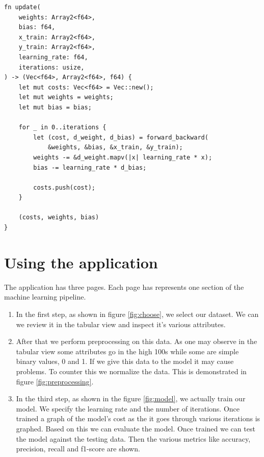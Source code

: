 \documentclass[12pt, a4]{article}
\begin{document}
\begin{verbatim}
fn update(
    weights: Array2<f64>,
    bias: f64,
    x_train: Array2<f64>,
    y_train: Array2<f64>,
    learning_rate: f64,
    iterations: usize,
) -> (Vec<f64>, Array2<f64>, f64) {
    let mut costs: Vec<f64> = Vec::new();
    let mut weights = weights;
    let mut bias = bias;

    for _ in 0..iterations {
        let (cost, d_weight, d_bias) = forward_backward(
            &weights, &bias, &x_train, &y_train);
        weights -= &d_weight.mapv(|x| learning_rate * x);
        bias -= learning_rate * d_bias;

        costs.push(cost);
    }

    (costs, weights, bias)
}
\end{verbatim}

\section{Using the application}

The application has three pages. Each page has represents one section of the
machine learning pipeline.

\begin{enumerate}
  \item{In the first step, as shown in figure \ref{fig:choose}, we select our
        dataset. We can we review it in the tabular view and inspect it's
        various attributes.}
  \item{After that we perform preprocessing on this data. As one may observe
        in the tabular view some attributes go in the high 100s while some
        are simple binary values, 0 and 1. If we give this data to the model
        it may cause problems. To counter this we normalize the data. This is
        demonstrated in figure \ref{fig:preprocessing}.}
  \item{In the third step, as shown in the figure \ref{fig:model}, we actually
        train our model. We specify the learning rate and the number of
        iterations. Once trained a graph of the model's cost as the it goes
        through various iterations is graphed. Based on this we can evaluate
        the model. Once trained we can test the model against the testing data.
        Then the various metrics like accuracy, precision, recall and f1-score
        are shown.}
\end{enumerate}
\end{document}
